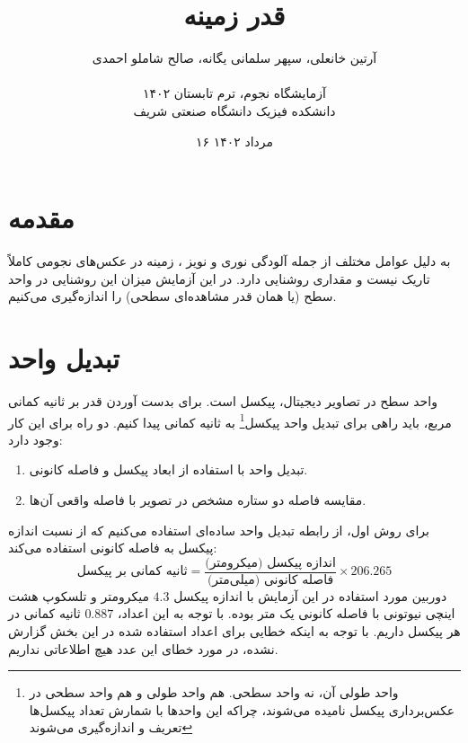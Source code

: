 \documentclass[12pt,a4paper]{article}
\title{قدر زمینه}
\author{آرتین خانعلی، سپهر سلمانی یگانه، صالح شاملو احمدی\\\\
	آزمایشگاه نجوم، ترم تابستان ۱۴۰۲\\دانشکده فیزیک دانشگاه صنعتی شریف}
\date{۱۶ مرداد ۱۴۰۲}
\begin{document}
	\maketitle
	\section{مقدمه}
	به دلیل عوامل مختلف از جمله آلودگی نوری و نویز ، زمینه در عکس‌های نجومی کاملاً تاریک نیست و
	مقداری روشنایی دارد. در این آزمایش میزان این روشنایی در واحد سطح (یا همان قدر مشاهده‌ای سطحی) را
	اندازه‌گیری می‌کنیم.
	\section{تبدیل واحد}
	واحد سطح در تصاویر دیجیتال، پیکسل است. برای بدست آوردن قدر بر ثانیه کمانی مربع، باید راهی برای تبدیل واحد
	پیکسل\footnote{واحد طولی آن، نه واحد سطحی. هم واحد طولی و هم واحد سطحی در عکس‌برداری پیکسل نامیده می‌شوند،
	چراکه این واحد‌ها با شمارش تعداد پیکسل‌ها تعریف و اندازه‌گیری می‌شوند} به ثانیه کمانی پیدا کنیم. دو راه برای
	این کار وجود دارد:
	\begin{enumerate}
	\item تبدیل واحد با استفاده از ابعاد پیکسل و فاصله کانونی.
	\item مقایسه فاصله دو ستاره مشخص در تصویر با فاصله واقعی آن‌ها.
	\end{enumerate}
	
	برای روش اول، از رابطه تبدیل واحد ساده‌ای استفاده می‌کنیم که از نسبت اندازه پیکسل به فاصله کانونی استفاده می‌کند:
	\begin{equation}
		\text{ثانیه کمانی بر پیکسل} = \frac{\text{اندازه پیکسل (میکرومتر)}}{\text{فاصله کانونی (میلی‌متر)}}
			\times 206.265
	\end{equation}
	دوربین مورد استفاده در این آزمایش  با اندازه پیکسل $4.3$ میکرو‌متر و تلسکوپ هشت اینچی نیوتونی
	با فاصله کانونی یک متر بوده. با توجه به این اعداد، $0.887$ ثانیه کمانی در هر پیکسل داریم. با توجه به اینکه خطایی
	برای اعداد استفاده شده در این بخش گزارش نشده، در مورد خطای این عدد هیچ اطلاعاتی نداریم.
	
\end{document}
